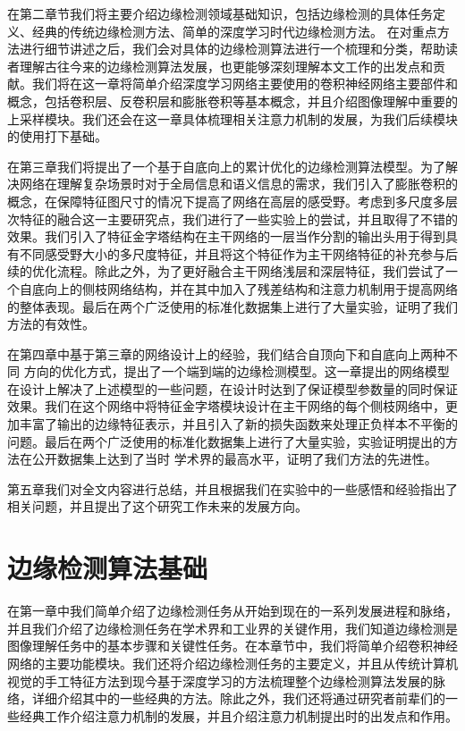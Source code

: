 \documentclass[master]{thesis-uestc}
\begin{document}
在第二章节我们将主要介绍边缘检测领域基础知识，包括边缘检测的具体任务定义、经典的传统边缘检测方法、简单的深度学习时代边缘检测方法。 在对重点方法进行细节讲述之后，我们会对具体的边缘检测算法进行一个梳理和分类，帮助读者理解古往今来的边缘检测算法发展，也更能够深刻理解本文工作的出发点和贡献。我们将在这一章将简单介绍深度学习网络主要使用的卷积神经网络主要部件和概念，包括卷积层、反卷积层和膨胀卷积等基本概念，并且介绍图像理解中重要的上采样模块。我们还会在这一章具体梳理相关注意力机制的发展，为我们后续模块的使用打下基础。

在第三章我们将提出了一个基于自底向上的累计优化的边缘检测算法模型。为了解决网络在理解复杂场景时对于全局信息和语义信息的需求，我们引入了膨胀卷积的概念，在保障特征图尺寸的情况下提高了网络在高层的感受野。考虑到多尺度多层次特征的融合这一主要研究点，我们进行了一些实验上的尝试，并且取得了不错的效果。我们引入了特征金字塔结构在主干网络的一层当作分割的输出头用于得到具有不同感受野大小的多尺度特征，并且将这个特征作为主干网络特征的补充参与后续的优化流程。除此之外，为了更好融合主干网络浅层和深层特征，我们尝试了一个自底向上的侧枝网络结构，并在其中加入了残差结构和注意力机制用于提高网络的整体表现。最后在两个广泛使用的标准化数据集上进行了大量实验，证明了我们方法的有效性。

在第四章中基于第三章的网络设计上的经验，我们结合自顶向下和自底向上两种不同 方向的优化方式，提出了一个端到端的边缘检测模型。这一章提出的网络模型在设计上解决了上述模型的一些问题，在设计时达到了保证模型参数量的同时保证效果。我们在这个网络中将特征金字塔模块设计在主干网络的每个侧枝网络中，更加丰富了输出的边缘特征表示，并且引入了新的损失函数来处理正负样本不平衡的问题。最后在两个广泛使用的标准化数据集上进行了大量实验，实验证明提出的方法在公开数据集上达到了当时 学术界的最高水平，证明了我们方法的先进性。

第五章我们对全文内容进行总结，并且根据我们在实验中的一些感悟和经验指出了相关问题，并且提出了这个研究工作未来的发展方向。

\chapter{边缘检测算法基础}
在第一章中我们简单介绍了边缘检测任务从开始到现在的一系列发展进程和脉络，并且我们介绍了边缘检测任务在学术界和工业界的关键作用，我们知道边缘检测是图像理解任务中的基本步骤和关键性任务。在本章节中，我们将简单介绍卷积神经网络的主要功能模块。我们还将介绍边缘检测任务的主要定义，并且从传统计算机视觉的手工特征方法到现今基于深度学习的方法梳理整个边缘检测算法发展的脉络，详细介绍其中的一些经典的方法。除此之外，我们还将通过研究者前辈们的一些经典工作介绍注意力机制的发展，并且介绍注意力机制提出时的出发点和作用。
\end{document}
